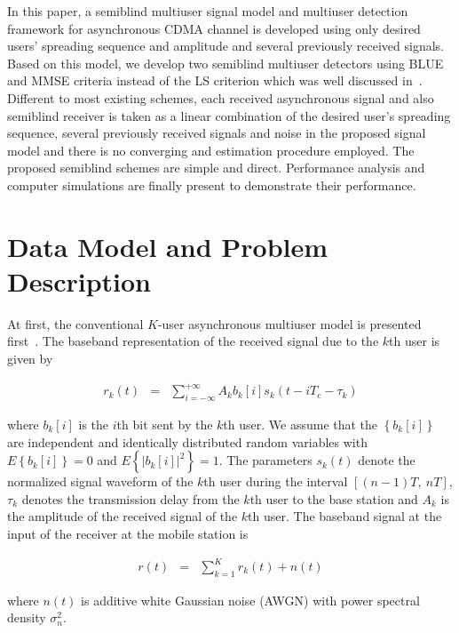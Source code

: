 \documentclass[a4paper,10pt,fleqn, twocolumn]{IEEETran}
\begin{document}
In this paper, a semiblind multiuser signal model and multiuser
detection framework for asynchronous CDMA channel is developed
using only desired users' spreading sequence and amplitude and
several previously received signals. Based on this model, we
develop two semiblind multiuser detectors using BLUE and MMSE
criteria instead of the LS criterion which was well discussed
in~\cite{Wang03d,Wang03e}. Different to most existing schemes,
each received asynchronous signal and also semiblind receiver is
taken as a linear combination of the desired user's spreading
sequence, several previously received signals and noise in the
proposed signal model and there is no converging and estimation
procedure employed. The proposed semiblind schemes are simple and
direct. Performance analysis and computer simulations are finally
present to demonstrate their performance.

\section{Data Model and Problem Description}
At first, the conventional $K$-user asynchronous multiuser model
is presented first~\cite{Verd98}. The baseband representation of
the received signal due to the $k$th user is given by

\begin{equation}
\begin{array}{rcl}
r_k(t)&=&\sum\limits_{i=-\infty}^{+\infty}A_k b_k[i]
s_k(t-iT_c-\tau_k)
\end{array}
\end{equation}

\noindent where $b_k[i]$ is the $i$th bit sent by the $k$th user.
We assume that the $\left\{b_k[i]\right\}$ are independent and
identically distributed random variables with
$E\left\{b_k[i]\right\}=0$ and $E\left\{|b_k[i]|^2\right\}=1$. The
parameters $s_k(t)$ denote the normalized signal waveform of the
$k$th user during the interval $[(n-1)T,\ nT]$, $\tau_k$ denotes
the transmission delay from the $k$th user to the base station and
$A_k$ is the amplitude of the received signal of the $k$th user.
The baseband signal at the input of the receiver at the mobile
station is

\begin{equation}
\begin{array}{rcl}
r(t)&=&\sum\limits_{k=1}^{K}r_k(t)+n(t)
\end{array}
\end{equation}

\noindent where $n(t)$ is additive white Gaussian noise (AWGN)
with power spectral density $\sigma_n^2$.
\end{document}
